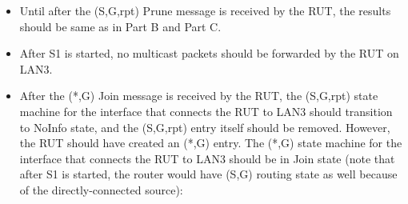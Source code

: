 \documentclass[11pt]{report}
\begin{document}
\begin{itemize}

  \item Until after the (S,G,rpt) Prune message is received by the RUT, the
  results should be same as in Part B and Part C.

  \item After S1 is started, no multicast packets should be
  forwarded by the RUT on LAN3.

  \item After the (*,G) Join message is received by the RUT,
  the (S,G,rpt) state machine for the interface that connects the RUT to
  LAN3 should transition to NoInfo state, and the (S,G,rpt) entry itself
  should be removed. However, the RUT should have created an (*,G) entry.
  The (*,G) state machine for the interface that connects the RUT to
  LAN3 should be in Join state (note that after S1 is started, the router
  would have (S,G) routing state as well because of the directly-connected
  source):


\end{itemize}
\end{document}
